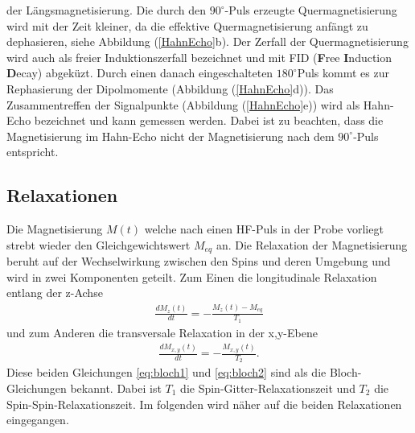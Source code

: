 der L\"{a}ngsmagnetisierung.
Die durch den $90^{\circ}$-Puls erzeugte Quermagnetisierung wird mit der Zeit kleiner, da die effektive Quermagnetisierung anf\"{a}ngt zu dephasieren, siehe Abbildung (\ref{HahnEcho}b).
Der Zerfall der Quermagnetisierung wird auch als freier Induktionszerfall bezeichnet und mit FID (\textbf{F}ree \textbf{I}nduction \textbf{D}ecay) abgek\"{u}zt.
Durch einen danach eingeschalteten $180^{\circ}${\-}Puls kommt es zur Rephasierung der Dipol{\-}mo{\-}men{\-}te (Abbildung (\ref{HahnEcho}d)).
Das Zusam{\-}men{\-}tref{\-}fen der Signalpunkte (Abbildung (\ref{HahnEcho}e)) wird als Hahn-Echo bezeichnet und kann gemessen werden.
Dabei ist zu beachten, dass die Magnetisierung im Hahn-Echo nicht der Magnetisierung nach dem $90^{\circ}$-Puls entspricht.

\subsection{Relaxationen}
Die Magnetisierung $M(t)$ welche nach einen HF-Puls in der Probe vorliegt strebt wieder den Gleichgewichtswert $M_{eq}$ an.
Die Relaxation der Magnetisierung beruht auf der Wechselwirkung zwischen den Spins und deren Umgebung und wird in zwei Komponenten geteilt.
Zum Einen die longitudinale Relaxation entlang der z-Achse
\begin{align}
	\frac{d M_z(t)}{d t} = - \frac{M_z(t) - M_{eq}}{T_1}
	\label{eq:bloch1}
\end{align}
und zum Anderen die transversale Relaxation in der x,y-Ebene
\begin{align}
	\frac{d M_{x,y}(t)}{d t} = - \frac{M_{x,y}(t)}{T_2}.
	\label{eq:bloch2}
\end{align}
Diese beiden Gleichungen \eqref{eq:bloch1} und \eqref{eq:bloch2} sind als die Bloch-Gleichungen bekannt.
Dabei ist $T_1$ die Spin-Gitter-Relaxationszeit und $T_2$ die Spin-Spin-Relaxationszeit.
Im folgenden wird n\"{a}her auf die beiden Relaxationen eingegangen.

